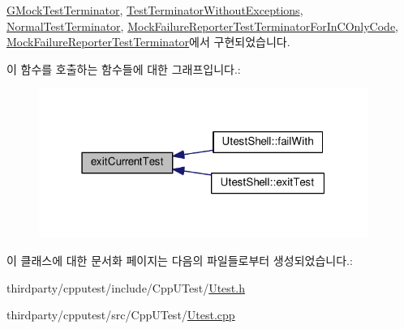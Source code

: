 \hyperlink{class_g_mock_test_terminator_a7f87c18375794ff3ed0f0141c9bd4bfd}{G\+Mock\+Test\+Terminator}, \hyperlink{class_test_terminator_without_exceptions_aea055d15b583b4c75114d737d94d2f53}{Test\+Terminator\+Without\+Exceptions}, \hyperlink{class_normal_test_terminator_aea055d15b583b4c75114d737d94d2f53}{Normal\+Test\+Terminator}, \hyperlink{class_mock_failure_reporter_test_terminator_for_in_c_only_code_a3fca445c375314fd6d1d123473e00a38}{Mock\+Failure\+Reporter\+Test\+Terminator\+For\+In\+C\+Only\+Code}, \hyperlink{class_mock_failure_reporter_test_terminator_a7f87c18375794ff3ed0f0141c9bd4bfd}{Mock\+Failure\+Reporter\+Test\+Terminator}에서 구현되었습니다.



이 함수를 호출하는 함수들에 대한 그래프입니다.\+:
\nopagebreak
\begin{figure}[H]
\begin{center}
\leavevmode
\includegraphics[width=304pt]{class_test_terminator_a57ed831fce5fb42abbfaf37b392eaa2f_icgraph}
\end{center}
\end{figure}




이 클래스에 대한 문서화 페이지는 다음의 파일들로부터 생성되었습니다.\+:\begin{DoxyCompactItemize}
\item 
thirdparty/cpputest/include/\+Cpp\+U\+Test/\hyperlink{_utest_8h}{Utest.\+h}\item 
thirdparty/cpputest/src/\+Cpp\+U\+Test/\hyperlink{_utest_8cpp}{Utest.\+cpp}\end{DoxyCompactItemize}

